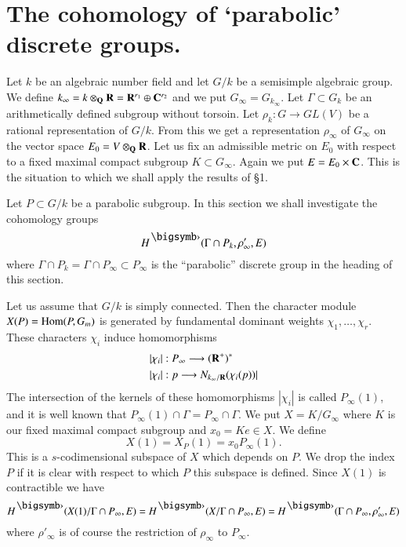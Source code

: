 \section{The cohomology of `parabolic' discrete groups.}\label{art5-sec2}
Let $k$ be an algebraic number field and let $G/ k$ be a semisimple algebraic group. We define $k_\infty = k \otimes_{\mathbf{Q}} \mathbf{R} = \mathbf{R}^{r_1} \oplus \mathbf{C}^{r_2}$ and we put $G_\infty = G_{k_\infty}$. Let $\Gamma \subset G_k$ be an arithmetically defined subgroup without torsoin. Let $\rho_k : G \to G L(V)$ be a rational representation of $G/ k$. From this we get a representation $\rho_\infty$ of $G_\infty$ on the vector space $E_0 = V \otimes_{\mathbf{Q}} \mathbf{R}$. Let us fix an admissible metric on $E_0$ with respect to a fixed maximal compact subgroup $K \subset G_\infty$. Again we put $E = E_0 \times \mathbf{C}$. This is the situation to which we shall apply the results of \S 1.

Let $P \subset G/k$ be a parabolic subgroup. In this section we shall investigate the cohomology groups 
$$
H^\bigdot (\Gamma \cap P_k, \rho'_\infty, E)
$$
where $\Gamma \cap P_k = \Gamma \cap P_\infty \subset P_\infty$ is the ``parabolic'' discrete group in the heading of this section.

Let us assume that $G/k$ is simply connected. Then the character module $X (P) =\operatorname{Hom} (P, G_m)$ is generated by fundamental dominant weights $\chi_1, \ldots, \chi_r$. These characters $\chi_i$ induce homomorphisms
\begin{align*}
& |\chi_i| : P_\infty \longrightarrow (\mathbf{R}^+)^\ast \\
& |\chi_i| : p \longrightarrow N_{k_\infty/\mathbf{R}} (\chi_i (p)) |
\end{align*}
The intersection of the kernels of these homomorphisms $|\chi_i|$ is called $P_\infty(1)$, and it is well known that $P_\infty (1) \cap \Gamma = P_\infty \cap \Gamma$. We put $X = K / G_\infty$ where $K$ is our fixed maximal compact subgroup and $x_0 = K e \in X$. We define
$$
X(1) = X_P (1) = x_0 P_\infty (1).
$$
This is a $s$-codimensional subspace of $X$ which depends on $P$. We drop the index $P$ if it is clear with respect to which $P$ this subspace is defined. Since $X (1)$ is contractible we have 
$$
H^\bigdot (X(1)/ \Gamma \cap P_\infty, E) = H^\bigdot (X/ \Gamma \cap P_\infty, E) = H^\bigdot (\Gamma \cap P_\infty, \rho'_\infty, E)
$$\pageoriginale
where $\rho'_\infty$ is of course the restriction of $\rho_\infty$ to $P_\infty$.

